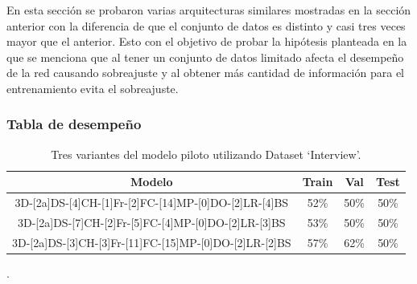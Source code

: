 \begin{onehalfspacing}
En esta sección se probaron varias arquitecturas similares mostradas en la sección anterior con la diferencia de que el conjunto de datos es distinto y casi tres veces mayor que el anterior. Esto con el objetivo de probar la hipótesis planteada en la que se menciona que al tener un conjunto de datos limitado afecta el desempeño de la red causando sobreajuste y al obtener más cantidad de información para el entrenamiento evita el sobreajuste.





\subsubsection{Tabla de desempeño}
\label{sec:TDesempenoVariantesModeloPilotoInterview}

\begin{table}[h!]
\centering
        \begin{tabular}{|c|c|c|c|}
        \hline 
        Modelo & Train & Val & Test\tabularnewline
        \hline 
        \hline 
        3D-{[}2a{]}DS-{[}4{]}CH-{[}1{]}Fr-{[}2{]}FC-{[}14{]}MP-{[}0{]}DO-[2]LR-[4]BS & 52\% & 50\% & 50\%\tabularnewline
        \hline 
        3D-{[}2a{]}DS-{[}7{]}CH-{[}2{]}Fr-{[}5{]}FC-{[}4{]}MP-{[}0{]}DO-[2]LR-[3]BS & 53\% & 50\% & 50\%\tabularnewline
        \hline 
        3D-{[}2a{]}DS-{[}3{]}CH-{[}3{]}Fr-{[}11{]}FC-{[}15{]}MP-{[}0{]}DO-[2]LR-[2]BS & 57\% & 62\% & 50\%\tabularnewline
        \hline 
    \end{tabular}
    \caption{\footnotesize  Tres variantes del modelo piloto utilizando Dataset `Interview'.}.
    \label{tab:RVariantesPilotoInterview}
\end{table}


\end{onehalfspacing}
